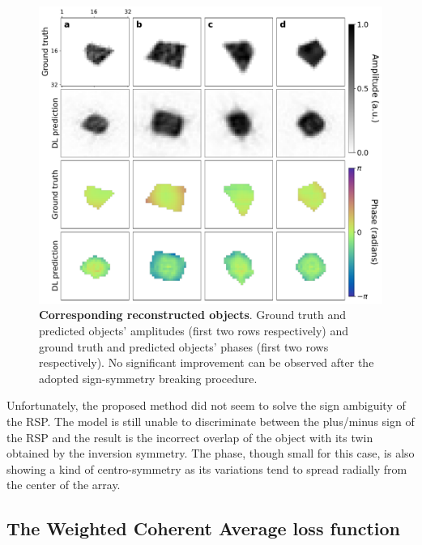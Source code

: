 \begin{figure}[H]
    \centering
    \includegraphics[width=.8\textwidth]{figures/Phasing/obj_low_strain_doubleMSE_symmJuSun.pdf}
    \caption{\textbf{Corresponding reconstructed objects}. Ground truth and predicted objects' amplitudes (first two rows 
    respectively) and ground truth and predicted objects' phases (first two rows respectively). No significant improvement 
    can be observed after the adopted sign-symmetry breaking procedure.}
    \label{fig:obj_lowStrain_doubleMSE_JuSun}
\end{figure}

Unfortunately, the proposed method did not seem to solve the sign ambiguity of the RSP. The model is still unable to 
discriminate between the plus/minus sign of the RSP and the result is the incorrect overlap of the object with its twin
obtained by the inversion symmetry. The phase, though small for this case, is also showing a kind of centro-symmetry 
as its variations tend to spread radially from the center of the array. 

\subsection{The Weighted Coherent Average loss function}

